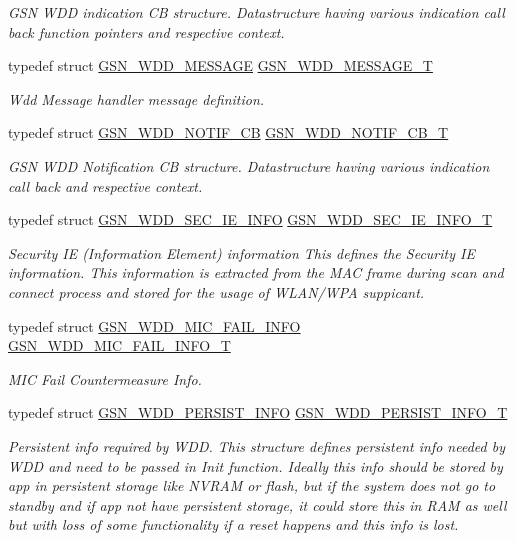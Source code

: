 \begin{DoxyCompactItemize}
\begin{DoxyCompactList}\small\item\em GSN WDD indication CB structure. Datastructure having various indication call back function pointers and respective context. \end{DoxyCompactList}\item 
typedef struct \hyperlink{a00277}{GSN\_\-WDD\_\-MESSAGE} \hyperlink{a00677_ga6dc6666c98a822d61766d4b3a8b6d2d5}{GSN\_\-WDD\_\-MESSAGE\_\-T}
\begin{DoxyCompactList}\small\item\em Wdd Message handler message definition. \end{DoxyCompactList}\item 
typedef struct \hyperlink{a00281}{GSN\_\-WDD\_\-NOTIF\_\-CB} \hyperlink{a00677_gab57828609030c2fd2947208559792aec}{GSN\_\-WDD\_\-NOTIF\_\-CB\_\-T}
\begin{DoxyCompactList}\small\item\em GSN WDD Notification CB structure. Datastructure having various indication call back and respective context. \end{DoxyCompactList}\item 
typedef struct \hyperlink{a00292}{GSN\_\-WDD\_\-SEC\_\-IE\_\-INFO} \hyperlink{a00677_ga70a9458f62036ad38be0efc8a1b65560}{GSN\_\-WDD\_\-SEC\_\-IE\_\-INFO\_\-T}
\begin{DoxyCompactList}\small\item\em Security IE (Information Element) information This defines the Security IE information. This information is extracted from the MAC frame during scan and connect process and stored for the usage of WLAN/WPA suppicant. \end{DoxyCompactList}\item 
typedef struct \hyperlink{a00278}{GSN\_\-WDD\_\-MIC\_\-FAIL\_\-INFO} \hyperlink{a00677_gae12a0e2aa7d3d161be1342b19d044cfb}{GSN\_\-WDD\_\-MIC\_\-FAIL\_\-INFO\_\-T}
\begin{DoxyCompactList}\small\item\em MIC Fail Countermeasure Info. \end{DoxyCompactList}\item 
typedef struct \hyperlink{a00282}{GSN\_\-WDD\_\-PERSIST\_\-INFO} \hyperlink{a00677_gaf6471274c5e1eeaf77be72eab076204e}{GSN\_\-WDD\_\-PERSIST\_\-INFO\_\-T}
\begin{DoxyCompactList}\small\item\em Persistent info required by WDD. This structure defines persistent info needed by WDD and need to be passed in Init function. Ideally this info should be stored by app in persistent storage like NVRAM or flash, but if the system does not go to standby and if app not have persistent storage, it could store this in RAM as well but with loss of some functionality if a reset happens and this info is lost. \end{DoxyCompactList}\item 

\end{DoxyCompactItemize}
